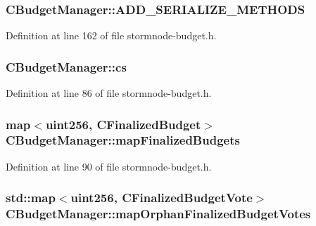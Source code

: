 \subsubsection[{A\+D\+D\+\_\+\+S\+E\+R\+I\+A\+L\+I\+Z\+E\+\_\+\+M\+E\+T\+H\+O\+D\+S}]{\setlength{\rightskip}{0pt plus 5cm}C\+Budget\+Manager\+::\+A\+D\+D\+\_\+\+S\+E\+R\+I\+A\+L\+I\+Z\+E\+\_\+\+M\+E\+T\+H\+O\+D\+S}\label{class_c_budget_manager_a078aded2505dc7329f29b0bd240b1649}


Definition at line 162 of file stormnode-\/budget.\+h.

\hypertarget{class_c_budget_manager_a67d5cdc1a964de128a2ba4d4b5590ebd}{}
\subsubsection[{cs}]{ C\+Budget\+Manager\+::cs\hspace{0.3cm}{\ttfamily [mutable]}}\label{class_c_budget_manager_a67d5cdc1a964de128a2ba4d4b5590ebd}


Definition at line 86 of file stormnode-\/budget.\+h.

\hypertarget{class_c_budget_manager_a68738720aa55de4b90fb10fb584547a9}{}
\subsubsection[{map\+Finalized\+Budgets}]{\setlength{\rightskip}{0pt plus 5cm}map$<${\bf uint256}, {\bf C\+Finalized\+Budget}$>$ C\+Budget\+Manager\+::map\+Finalized\+Budgets}\label{class_c_budget_manager_a68738720aa55de4b90fb10fb584547a9}


Definition at line 90 of file stormnode-\/budget.\+h.

\hypertarget{class_c_budget_manager_ad0d6a72545f4057ff5ffba11fc122ac7}{}
\subsubsection[{map\+Orphan\+Finalized\+Budget\+Votes}]{\setlength{\rightskip}{0pt plus 5cm}std\+::map$<${\bf uint256}, {\bf C\+Finalized\+Budget\+Vote}$>$ C\+Budget\+Manager\+::map\+Orphan\+Finalized\+Budget\+Votes}\label{class_c_budget_manager_ad0d6a72545f4057ff5ffba11fc122ac7}



